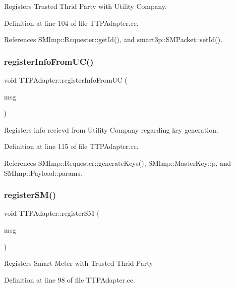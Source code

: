 Registers Trusted Thrid Party with Utility Company. 

Definition at line 104 of file T\+T\+P\+Adapter.\+cc.



References S\+M\+Imp\+::\+Requester\+::get\+Id(), and smart3p\+::\+S\+M\+Packet\+::set\+Id().

\mbox{\label{classTTPAdapter_a9aa8948a5224e2cf567eaacb2dcee6ab}} 
\subsubsection{\texorpdfstring{register\+Info\+From\+U\+C()}{registerInfoFromUC()}}
{\footnotesize\ttfamily void T\+T\+P\+Adapter\+::register\+Info\+From\+UC (\begin{DoxyParamCaption}\item[{omnetpp\+::c\+Message $\ast$}]{msg }\end{DoxyParamCaption})}

Registers info recievd from Utility Company regarding key generation. 

Definition at line 115 of file T\+T\+P\+Adapter.\+cc.



References S\+M\+Imp\+::\+Requester\+::generate\+Keys(), S\+M\+Imp\+::\+Master\+Key\+::p, and S\+M\+Imp\+::\+Payload\+::params.

\mbox{\label{classTTPAdapter_ad53a31939a278d3c114f79bea64f81f0}} 
\subsubsection{\texorpdfstring{register\+S\+M()}{registerSM()}}
{\footnotesize\ttfamily void T\+T\+P\+Adapter\+::register\+SM (\begin{DoxyParamCaption}\item[{omnetpp\+::c\+Message $\ast$}]{msg }\end{DoxyParamCaption})}

Registers Smart Meter with Trusted Thrid Party 

Definition at line 98 of file T\+T\+P\+Adapter.\+cc.



